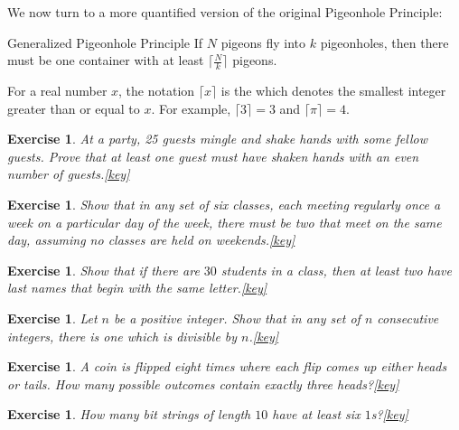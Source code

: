 \documentclass{book}
\newcounter{ekcounter}%
\theoremstyle{ekimcustom}
\newtheorem{exercise}[ekcounter]{Exercise}
\newcommand\defn[1]{{\color{blue}{\bf #1}}}
\begin{document}
We now turn to a more quantified version of the original Pigeonhole Principle:
\begin{btheorem}{Generalized Pigeonhole Principle}{}
If $N$ pigeons fly into $k$ pigeonholes, then there must be one container with at least $\lceil \frac{N}{k} \rceil$ pigeons.
\end{btheorem}
For a real number $x$, the notation $\lceil x \rceil$ is the \defn{ceiling} which denotes the smallest integer greater than or equal to $x$. For example, $\lceil 3 \rceil = 3$ and $\lceil \pi \rceil = 4$.

\begin{exercise}
At a party, 25 guests mingle and shake hands with some fellow guests. Prove that at least one guest must have shaken hands with an even number of guests.\quad\quad\href{https://www.sharelatex.com/project/5a073668a150fe764ab07af2}{{\color{red}[key]}}
\end{exercise}

\begin{exercise}
Show that in any set of six classes, each meeting regularly once a week on a particular day of the week, there must be two that meet on the same day, assuming no classes are held on weekends.\quad\quad\href{https://www.sharelatex.com/read/dgwqxczykwmz}{{\color{red}[key]}}
\end{exercise}

\begin{exercise}
Show that if there are $30$ students in a class, then at least two have last names that begin with the same letter.\quad\quad\href{https://www.sharelatex.com/read/myyftvqqkdmn}{{\color{red}[key]}}
\end{exercise}

\begin{exercise}
Let $n$ be a positive integer. Show that in any set of $n$ consecutive integers, there is one which is divisible by $n$.\quad\quad\href{https://www.sharelatex.com/read/bzypcvggmrfp}{{\color{red}[key]}}
\end{exercise}

\begin{exercise}
A coin is flipped eight times where each flip comes up either heads or tails. How many possible outcomes contain exactly three heads?\quad\quad\href{https://www.sharelatex.com/read/hzmjpccrwxrx}{{\color{red}[key]}}
\end{exercise}

\begin{exercise}
How many bit strings of length $10$ have at least six $1$s?\quad\quad\href{https://www.sharelatex.com/read/wbgndpfyrdnn}{{\color{red}[key]}}
\end{exercise}
\end{document}
